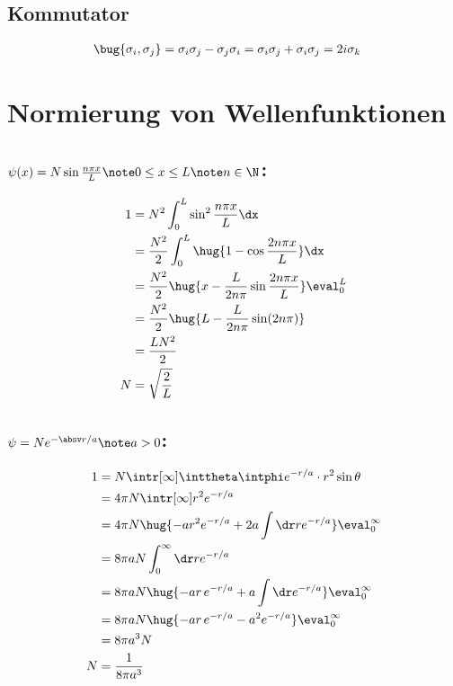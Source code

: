 \documentclass[ex]{exercise}
\begin{document}
\subsection{Kommutator}
\begin{align*}
    \bug{\sigma_i, \sigma _j} &= \sigma_i \sigma_j - \sigma_j \sigma_i
    = \sigma_i \sigma_j + \sigma_i \sigma_j
    = 2 i \sigma_k
\end{align*}

\section{Normierung von Wellenfunktionen}
\subsection{\(\psi(x) = N \sin\frac{n\pi x}{L}\note 0\le x\le L\note n\in\N\):}
\begin{align*}
    1 &= N^2 \int_0^L \sin^2\frac{n\pi x}{L}\dx\\
    &= \frac {N^2}2 \int_0^L \hug{1-\cos\frac{2n\pi x}{L}}\dx\\
    &= \frac {N^2}2 \hug{x-\frac{L}{2n\pi}\sin\frac{2n\pi x}{L}}\eval_0^L\\
    &= \frac {N^2}2 \hug{L-\frac{L}{2n\pi}\sin(2n\pi)}\\
    &= \frac {L N^2}2\\
    N &= \sqrt{\frac 2L}
\end{align*}

\subsection{\(\psi = N e^{-\absv r /a}\note a >0\):}
\begin{align*}
    1 &= N \intr[\infty]\inttheta\intphi e^{-r/a}\cdot r^2\sin\theta\\
    &= 4\pi N \intr[\infty] r^2 e^{-r/a}\\
    &= 4\pi N \hug{-a r^2 e^{-r/a} + 2a\int \dr r e^{-r/a}}\eval_0^\infty\\
    &= 8\pi a N \int_0^\infty \dr r e^{-r/a}\\
    &= 8\pi a N \hug{-a r\, e^{-r/a} + a \int \dr e^{-r/a}}\eval_0^\infty\\
    &= 8\pi a N \hug{-a r\, e^{-r/a} - a^2 e^{-r/a}}\eval_0^\infty\\
    &= 8\pi a^3 N\\
    N &= \frac1{8\pi a^3}
\end{align*}
\end{document}
